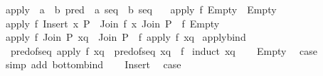 \begin{isabellebody}
\endisatagproof
{\isafoldproof}%
%
\isadelimproof
\isanewline
%
\endisadelimproof
\isanewline
{}\isamarkupfalse%
\ {\isachardoublequoteopen}apply{\isachardoublequoteclose}\ {\isacharcolon}{\kern0pt}{\isacharcolon}{\kern0pt}\ {\isachardoublequoteopen}{\isacharparenleft}{\kern0pt}{\isacharprime}{\kern0pt}a\ {\isasymRightarrow}\ {\isacharprime}{\kern0pt}b\ pred{\isacharparenright}{\kern0pt}\ {\isasymRightarrow}\ {\isacharprime}{\kern0pt}a\ seq\ {\isasymRightarrow}\ {\isacharprime}{\kern0pt}b\ seq{\isachardoublequoteclose}\ \isanewline
\ \ {\isachardoublequoteopen}apply\ f\ Empty\ {\isacharequal}{\kern0pt}\ Empty{\isachardoublequoteclose}\isanewline
{\isacharbar}{\kern0pt}\ {\isachardoublequoteopen}apply\ f\ {\isacharparenleft}{\kern0pt}Insert\ x\ P{\isacharparenright}{\kern0pt}\ {\isacharequal}{\kern0pt}\ Join\ {\isacharparenleft}{\kern0pt}f\ x{\isacharparenright}{\kern0pt}\ {\isacharparenleft}{\kern0pt}Join\ {\isacharparenleft}{\kern0pt}P\ {\isasymbind}\ f{\isacharparenright}{\kern0pt}\ Empty{\isacharparenright}{\kern0pt}{\isachardoublequoteclose}\isanewline
{\isacharbar}{\kern0pt}\ {\isachardoublequoteopen}apply\ f\ {\isacharparenleft}{\kern0pt}Join\ P\ xq{\isacharparenright}{\kern0pt}\ {\isacharequal}{\kern0pt}\ Join\ {\isacharparenleft}{\kern0pt}P\ {\isasymbind}\ f{\isacharparenright}{\kern0pt}\ {\isacharparenleft}{\kern0pt}apply\ f\ xq{\isacharparenright}{\kern0pt}{\isachardoublequoteclose}\isanewline
\isanewline
{}\isamarkupfalse%
\ apply{\isacharunderscore}{\kern0pt}bind{\isacharcolon}{\kern0pt}\isanewline
\ \ {\isachardoublequoteopen}pred{\isacharunderscore}{\kern0pt}of{\isacharunderscore}{\kern0pt}seq\ {\isacharparenleft}{\kern0pt}apply\ f\ xq{\isacharparenright}{\kern0pt}\ {\isacharequal}{\kern0pt}\ pred{\isacharunderscore}{\kern0pt}of{\isacharunderscore}{\kern0pt}seq\ xq\ {\isasymbind}\ f{\isachardoublequoteclose}\isanewline
%
\isadelimproof
%
\endisadelimproof
%
\isatagproof
{}\isamarkupfalse%
\ {\isacharparenleft}{\kern0pt}induct\ xq{\isacharparenright}{\kern0pt}\isanewline
\ \ \isamarkupfalse%
\ Empty\ \isamarkupfalse%
\ {\isacharquery}{\kern0pt}case\isanewline
\ \ \ \ \isamarkupfalse%
\ {\isacharparenleft}{\kern0pt}simp\ add{\isacharcolon}{\kern0pt}\ bottom{\isacharunderscore}{\kern0pt}bind{\isacharparenright}{\kern0pt}\isanewline
{}\isamarkupfalse%
\isanewline
\ \ \isamarkupfalse%
\ Insert\ \isamarkupfalse%
\ {\isacharquery}{\kern0pt}case\isanewline
\ \ \ \ \isamarkupfalse%

\end{isabellebody}
